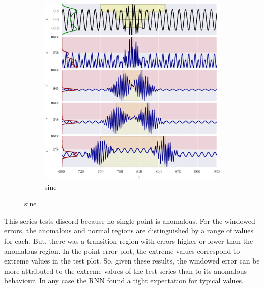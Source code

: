 \begin{figure}[!hp]
    \ContinuedFloat 
  
    \begin{subfigure}[t]{\textwidth}
        \centering
        \includegraphics[]{figs/er_sin.pdf}
        \caption{sine}
    \end{subfigure}%

\end{figure}

This series tests discord because no single point is anomalous.
%
For the windowed errors, the anomalous and normal regions are distinguished by a range of values for each.
%
But, there was a transition region with errors higher or lower than the anomalous region.
%
In the point error plot, the extreme values correspond to extreme values in the test plot.
%
So, given these results, the windowed error can be more attributed to the extreme values of the test series than to its anomalous behaviour.
%
In any case the RNN found a tight expectation for typical values.


